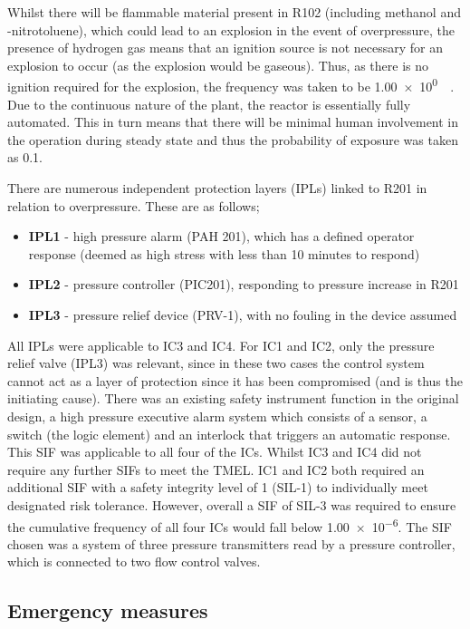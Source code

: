 Whilst there will be flammable material present in R102 (including methanol and \ortho-nitrotoluene), which could lead to an explosion in the event of overpressure, the presence of hydrogen gas means that an ignition source is not necessary for an explosion to occur (as the explosion would be gaseous). Thus, as there is no ignition required for the explosion, the frequency was taken to be \SI{1.00e0}{\per\year}. Due to the continuous nature of the plant, the reactor is essentially fully automated. This in turn means that there will be minimal human involvement in the operation during steady state and thus the probability of exposure was taken as 0.1. 

There are numerous  independent protection layers (IPLs) linked to R201 in relation to overpressure. These are as follows;
 
 \begin{itemize}
\item \textbf{IPL1} - high pressure alarm (PAH 201), which has a defined operator response (deemed as high stress with less than 10 minutes to respond)
\item  \textbf{IPL2} - pressure controller (PIC201), responding to pressure increase in R201
\item  \textbf{IPL3} - pressure relief device (PRV-1), with no fouling in the device assumed
 \end{itemize}

All IPLs were applicable to IC3 and IC4. For IC1 and IC2, only the pressure relief valve (IPL3) was relevant, since in these two cases the control system cannot act as a layer of protection since it has been compromised (and is thus the initiating cause). There was an existing safety instrument function in the original design, a high pressure executive alarm system which consists of a sensor, a switch (the logic element) and an interlock that triggers an automatic response. This SIF was applicable to all four of the ICs. Whilst IC3 and IC4 did not require any further SIFs to meet the TMEL. IC1 and IC2 both required an additional SIF with a safety integrity level of 1 (SIL-1) to individually meet designated risk tolerance. However, overall a SIF of SIL-3 was required to ensure the cumulative frequency of all four ICs would fall below \num{1.00e-6}. The SIF chosen was a system of three pressure transmitters read by a pressure controller, which is connected to two flow control valves. 


\subsection{Emergency measures }

